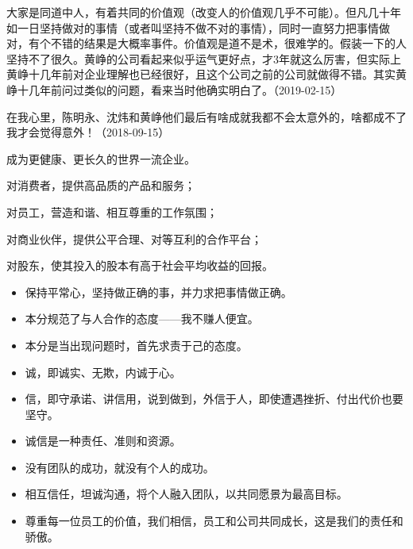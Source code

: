 大家是同道中人，有着共同的价值观（改变人的价值观几乎不可能）。但凡几十年如一日坚持做对的事情（或者叫坚持不做不对的事情），同时一直努力把事情做对，有个不错的结果是大概率事件。价值观是道不是术，很难学的。假装一下的人坚持不了很久。黄峥的公司看起来似乎运气更好点，才3年就这么厉害，但实际上黄峥十几年前对企业理解也已经很好，且这个公司之前的公司就做得不错。其实黄峥十几年前问过类似的问题，看来当时他确实明白了。（2019-02-15）

在我心里，陈明永、沈炜和黄峥他们最后有啥成就我都不会太意外的，啥都成不了我才会觉得意外！（2018-09-15）



成为更健康、更长久的世界一流企业。


对消费者，提供高品质的产品和服务；

对员工，营造和谐、相互尊重的工作氛围；

对商业伙伴，提供公平合理、对等互利的合作平台；

对股东，使其投入的股本有高于社会平均收益的回报。



\begin{itemize}
\item 保持平常心，坚持做正确的事，并力求把事情做正确。
\item 本分规范了与人合作的态度——我不赚人便宜。
\item 本分是当出现问题时，首先求责于己的态度。
\end{itemize}


\begin{itemize}
\item 诚，即诚实、无欺，内诚于心。
\item 信，即守承诺、讲信用，说到做到，外信于人，即使遭遇挫折、付出代价也要坚守。
\item 诚信是一种责任、准则和资源。
\end{itemize}


\begin{itemize}
\item 没有团队的成功，就没有个人的成功。
\item 相互信任，坦诚沟通，将个人融入团队，以共同愿景为最高目标。
\item 尊重每一位员工的价值，我们相信，员工和公司共同成长，这是我们的责任和骄傲。
\end{itemize}

